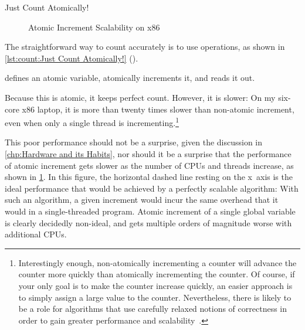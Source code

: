 \begin{listing}

\caption{Just Count Atomically!}
\label{lst:count:Just Count Atomically!}
\end{listing}

\begin{figure}
\centering
{}
\caption{Atomic Increment Scalability on x86}
\label{fig:count:Atomic Increment Scalability on x86}
\end{figure}

The straightforward way to count accurately is to use  operations,
as shown in
\cref{lst:count:Just Count Atomically!} ().
\begin{fcvref}
 defines an atomic variable,
 atomically increments it, and
 reads it out.
\end{fcvref}
Because this is atomic, it keeps perfect count.
However, it is slower:
On my six-core x86 laptop, it is more than
twenty times slower than non-atomic increment, even
when only a single thread is incrementing.\footnote{
	Interestingly enough, non-atomically incrementing a counter will
	advance the counter more quickly than atomically incrementing
	the counter.
	Of course, if your only goal is to make the counter increase
	quickly, an easier approach is to simply assign a large value
	to the counter.
	Nevertheless, there is likely to be a role for algorithms that
	use carefully relaxed notions of correctness in order to gain
	greater performance and
	scalability~\cite{Andrews91textbook,Arcangeli03,10.5555/3241639.3241645,DavidUngar2011unsync}.}

This poor performance should not be a surprise, given the discussion in
\cref{chp:Hardware and its Habits},
nor should it be a surprise that the performance of atomic increment
gets slower as the number of CPUs and threads increase, as shown in
\cref{fig:count:Atomic Increment Scalability on x86}.
In this figure, the horizontal dashed line resting on the x~axis
is the ideal performance that would be achieved
by a perfectly scalable algorithm:
With such an algorithm, a given increment would incur the same
overhead that it would in a single-threaded program.
Atomic increment of a single global variable is clearly
decidedly non-ideal, and gets multiple orders of magnitude worse with
additional CPUs.

